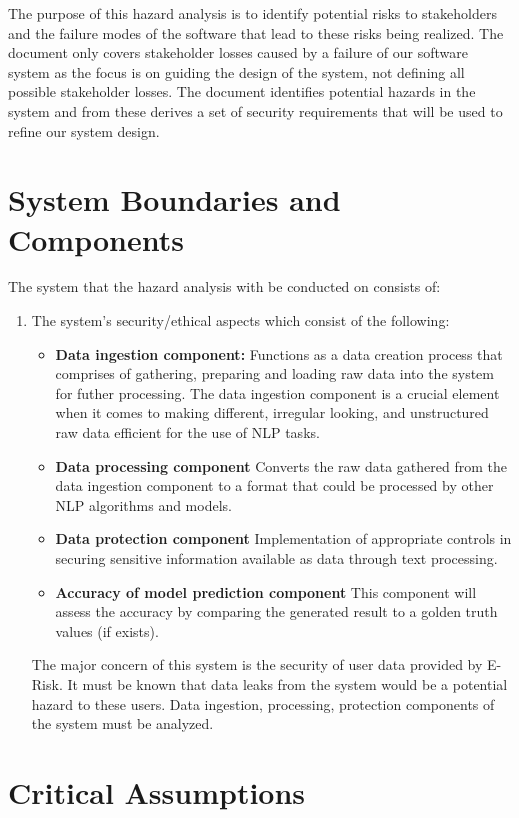 \documentclass{article}
\begin{document}
The purpose of this hazard analysis is to identify potential risks to stakeholders and the failure modes of the software that lead to these risks being realized. The document only covers stakeholder losses caused by a failure of our software system as the focus is on guiding the design of the system, not defining all possible stakeholder losses. The document identifies potential hazards in the system and from these derives a set of security requirements that will be used to refine our system design.

\section{System Boundaries and Components}

The system that the hazard analysis with be conducted on consists of:

\begin{enumerate}
	\item The system's security/ethical aspects which consist of the following:
	      \begin{itemize}
              \item\textbf{Data ingestion component: } Functions as a data creation process that comprises of gathering, preparing and loading raw data into the system for futher processing. The data ingestion component is a crucial element when it comes to making different, irregular looking, and unstructured raw data efficient for the use of NLP tasks.
		      \item \textbf{Data processing component} Converts the raw data gathered from the data ingestion component to a format that could be processed by other NLP algorithms and models.
		      \item \textbf{Data protection component} Implementation of appropriate controls in securing sensitive information available as data through text processing.
		      \item \textbf{Accuracy of model prediction component} This component will assess the accuracy by comparing the generated result to a golden truth values (if exists).
	      \end{itemize}
	The major concern of this system is the security of user data provided by E-Risk. It must be known that data leaks from the system would be a potential hazard to these users. Data ingestion, processing, protection components of the system must be analyzed. 
\end{enumerate}

\section{Critical Assumptions}
\end{document}
